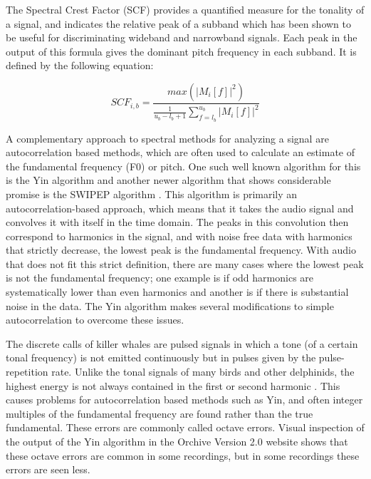 \documentclass[12pt,oneside]{book}
\begin{document}
The Spectral Crest Factor (SCF) provides a quantified measure for the
tonality of a signal, and indicates the relative peak of a subband
which has been shown to be useful \cite{hosseinzadeh2007mfcc} for
discriminating wideband and narrowband signals.  Each peak in the
output of this formula gives the dominant pitch frequency in each
subband.  It is defined by the following equation:

\begin{equation} 
SCF_{i,b} = \frac{max(|M_i[f]|^2)}
	                {\frac{1}{u_b - l_b + 1}\sum_{f=l_b}^{u_b} |M_i [f]|^2} 
\end{equation}

A complementary approach to spectral methods for analyzing a signal
are autocorrelation based methods, which are often used to calculate
an estimate of the fundamental frequency (F0) or pitch.  One such well
known algorithm for this is the Yin algorithm \cite{cheveigne2002yin}
and another newer algorithm that shows considerable promise is the
SWIPEP algorithm \cite{camachophd}.  This algorithm is primarily an
autocorrelation-based approach, which means that it takes the audio
signal and convolves it with itself in the time domain.  The peaks in
this convolution then correspond to harmonics in the signal, and with
noise free data with harmonics that strictly decrease, the lowest peak
is the fundamental frequency.  With audio that does not fit this
strict definition, there are many cases where the lowest peak is not
the fundamental frequency; one example is if odd harmonics are
systematically lower than even harmonics and another is if there is
substantial noise in the data.  The Yin algorithm makes several
modifications to simple autocorrelation to overcome these issues.

The discrete calls of killer whales are pulsed signals in which a tone
(of a certain tonal frequency) is not emitted continuously but in
pulses given by the pulse-repetition rate. Unlike the tonal signals of
many birds and other delphinids, the highest energy is not always
contained in the first or second harmonic
\cite{deecke1999quantifying}.  This causes problems for
autocorrelation based methods such as Yin, and often integer multiples
of the fundamental frequency are found rather than the true
fundamental.  These errors are commonly called octave errors.  Visual
inspection of the output of the Yin algorithm in the Orchive Version
2.0 website shows that these octave errors are common in some
recordings, but in some recordings these errors are seen less.
\end{document}
